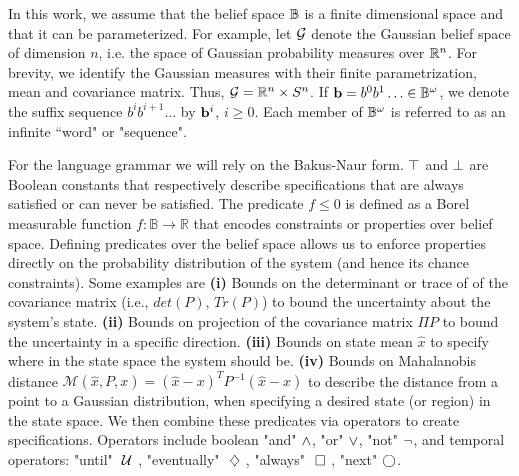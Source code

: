 \documentclass[letterpaper]{article} %
\begin{document}
    In this work, we assume that the belief space $\mathbb{B}$ is  a finite dimensional space and that it can be parameterized. For example, let $\mathcal{G}$ denote the Gaussian belief space
    of dimension $n$, i.e. the space of Gaussian
    probability measures over $\mathbb{R}^n$.
    For brevity, we identify the Gaussian measures
    with their finite parametrization, mean and
    covariance matrix. Thus,
    $\mathcal{G} =  \mathbb{R}^n \times  S^n$.
    If $\mathbf{b} = b^0b^1 \ldots \in \mathbb{B}^{\omega}$,
    we denote the suffix sequence $b^i b^{i+1} \ldots$ by
    $\mathbf{b}^i$, $i \geq 0$.
    Each member of $\mathbb{B}^\omega$ is referred to as an infinite ``word" or "sequence".
    
    For the language grammar we will rely on the Bakus-Naur form. $\top$ and $\perp$ are Boolean constants that respectively describe specifications that are always satisfied or can never be satisfied. 
    The predicate $f\leq 0$ is defined as a Borel measurable function $f:\mathbb{B}\rightarrow \mathbb{R}$ that encodes constraints or properties over belief space. Defining predicates over the belief space allows us to enforce properties directly on the probability distribution of the system (and hence its chance constraints). Some examples are \textbf{(i)} Bounds on the determinant or trace of of the covariance matrix (i.e., $det(P)$, $Tr(P)$) to  bound the uncertainty about the system's state. \textbf{(ii)} Bounds on projection of the covariance matrix $\Pi P$ to bound the uncertainty in a specific direction.
%
%
    \textbf{(iii)} Bounds on state mean $\hat{x}$ to specify
    where in the state space the system should be. \textbf{(iv)} Bounds on Mahalanobis distance $\mathcal{M}(\hat{x},P,x) = (\hat{x}-x)^TP^{-1}(\hat{x}-x)$
    to describe the distance from a point to a Gaussian distribution, when specifying a desired state (or region) in the state space. We then combine these predicates via operators to create specifications. Operators include boolean "and" $\wedge$, "or" $\vee$, "not" $\neg$, and temporal operators: "until" $\ \mathcal{U}\ $, "eventually" $\ \diamondsuit\ $, "always" $\ \square\ $, "next" $\bigcirc$.
    
    
\end{document}
